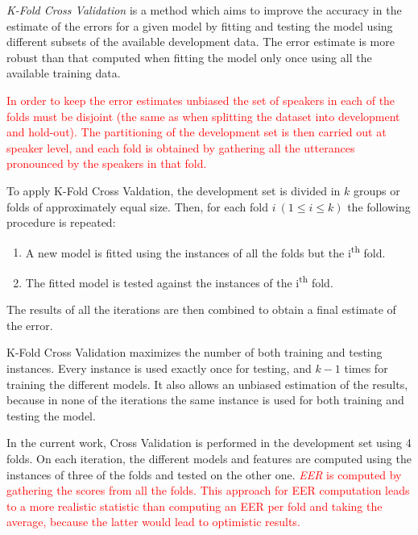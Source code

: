 \textit{K-Fold Cross Validation} \cite{svm_jwht}
is a method which aims to improve the accuracy in the
estimate of the errors for a given model by fitting and testing the model using different
subsets of the available development data. The error estimate is more robust than
that computed when fitting the model only once using all the available training data.

\textcolor{red}{
  In order to keep the error estimates unbiased
  the set of speakers in each of the folds must be disjoint (the same as
  when splitting the dataset into development and hold-out).
  The partitioning of the development set
  is then carried out at speaker level, and each fold is obtained by gathering all the
  utterances pronounced by the speakers in that fold.
}

To apply K-Fold Cross Valdation,
the development set is divided in $k$ groups or folds of approximately equal size.
Then, for each fold $i \ (1 \leq i \leq k)$ the following procedure is repeated:

\begin{enumerate}
  \item A new model is fitted using the instances of all the folds but the i\textsuperscript{th} fold.
  \item The fitted model is tested against the instances of the i\textsuperscript{th} fold.
\end{enumerate}

The results of all the iterations are then combined to obtain a final estimate of the error.

K-Fold Cross Validation maximizes the number of both training and testing instances.
Every instance is used exactly once for testing, and $k-1$ times for training the different
models. It also allows an unbiased estimation of the results,
because in none of the iterations the same instance is used for both training and testing the
model.

In the current work, Cross Validation is performed in the development set using 4 folds.
On each iteration, the different models and features are computed using the instances of
three of the folds and tested on the other one.
\textcolor{red}{
  \textit{EER} is computed by gathering the scores from all the folds.
  This approach for EER computation leads to a more realistic statistic than computing an EER
  per fold and taking the average, because the latter would lead to optimistic results.
}
